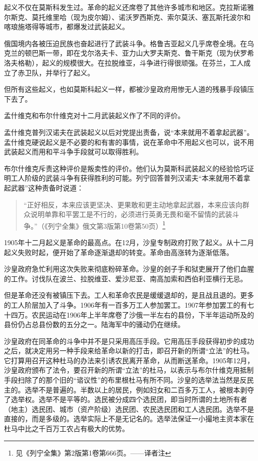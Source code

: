 起义不仅在莫斯科发生过。革命的起义还席卷了其他许多城市和地区。克拉斯诺雅尔斯克、莫托维里哈（现为皮尔姆）、诺沃罗西斯克、索尔莫沃、塞瓦斯托波尔和喀琅施塔得等城市，都爆发过武装起义。

俄国境内各被压迫民族也奋起进行了武装斗争。格鲁吉亚起义几乎席卷全境。在乌克兰的顿巴斯一带，即在戈尔洛夫卡、亚力山大罗夫斯克、鲁干斯克（现为伏罗希洛夫格勒），起义的规模很大。在拉脱维亚，斗争进行得很顽强。在芬兰，工人成立了赤卫队，并举行了起义。

但所有这些起义，也如莫斯科起义一样，都被沙皇政府用惨无人道的残暴手段镇压下去了。

孟什维克和布尔什维克对十二月武装起义作了不同的评价。

孟什维克普列汉诺夫在武装起义以后对党提出责备，说“本来就用不着拿起武器”。孟什维克硬说起义是不必要的和有害的事情，说在革命中不用起义也可以，说不用武装起义而用和平斗争手段就可以取得胜利。

布尔什维克斥责这种评价是叛卖性的评价。他们认为莫斯科武装起义的经验恰巧证明工人阶级的武装斗争有获得胜利的可能。列宁回答普列汉诺夫“本来就用不着拿起武器”这种责备时说道：

\begin{quotation}
“正好相反，本来应该更坚决、更果敢和更主动地拿起武器，本来应该向群众说明单靠和平罢工是不行的，必须进行英勇无畏和毫不留情的武装斗争。”（《列宁全集》俄文第3版第10卷第50页）\footnote{见《列宁全集》第2版第1卷第666页。——译者注}
\end{quotation}

1905年十二月起义是革命的最高点。在12月，沙皇专制政府打败了起义。从十二月起义失败时起，便开始了革命逐渐退却的转变。革命由高涨转为逐渐低落。

沙皇政府急忙利用这次失败来彻底粉碎革命。沙皇的刽子手和狱吏展开了他们血腥的工作。讨伐队在波兰、拉脱维亚、爱沙尼亚、南高加索和西伯利亚横行无忌。

但是革命还没有被镇压下去。工人和革命农民是缓缓退却的，是且战且退的。更多的工人阶层加入了斗争。1906年有一百多万工人参加罢工。1907年参加罢工的有七十四万。农民运动在1906年上半年席卷了沙俄一半左右的县份，下半年运动所及的县份仍占总县份数的五分之一。陆海军中的骚动仍在继续。

沙皇政府在同革命的斗争中并不是只采用高压手段。它用高压手段获得初步的成功之后，就决定用另一种手段来给革命以新的打击，即召开新的所谓“立法”的杜马。它打算用召开这种杜马的办法来引诱农民离开革命，从而断送革命。1905年12月，沙皇政府颁布了法令，要召开新的所谓“立法”的杜马，以表示与布尔什维克用抵制手段扫除了的那个旧的“谘议性”的布里根杜马有所不同。沙皇的选举法当然是反民主的。选举不是普遍的。半数以上的居民，例如妇女和二百多万工人，被根本剥夺了选举权。选举不是平等的。选民被分成四个选民团，即当时所谓的土地所有者（地主）选民团、城市（资产阶级）选民团、农民选民团和工人选民团。选举不是直接的，而是多级的。选举实际上不是无记名的。选举法保证一小撮地主资本家在杜马中比之千百万工农占有极大的优势。

